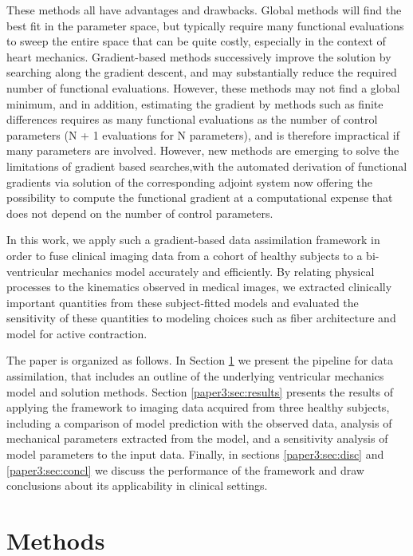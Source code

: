 These methods all have advantages and drawbacks.  Global methods will find the best fit in the parameter space, but typically require many functional evaluations to sweep
the entire space that can be quite costly, especially in the context of heart mechanics. Gradient-based
methods successively improve the solution by
searching along the gradient descent, and may substantially reduce the
required number of functional evaluations. However, these methods may
not find a global minimum, and in addition, estimating the
gradient by methods such as finite differences requires as
  many functional evaluations as the number of control parameters (N + 1
  evaluations for N parameters), and is therefore impractical
 if many parameters are involved.
However, new methods are emerging to solve the limitations of gradient based searches,with the automated derivation of functional gradients
via solution of the corresponding adjoint system \citep{farrell2013automated}
now offering the possibility to compute the functional gradient at a computational
expense that does not depend on the number of control parameters.

In this work, we apply such a gradient-based data assimilation framework
in order to fuse clinical imaging data from a cohort of healthy subjects to
a bi-ventricular mechanics model accurately and efficiently. By relating physical processes to the
kinematics observed in medical images, we extracted clinically
important quantities from these subject-fitted models and evaluated the
sensitivity of these quantities to modeling choices such as fiber
architecture and model for active contraction.  

The paper is organized as follows. In Section
\ref{paper3:sec:methods} we present the pipeline for data assimilation,
that includes an outline of the underlying ventricular
mechanics model and solution methods. Section \ref{paper3:sec:results}
presents the results of applying the framework to imaging data
acquired from three healthy subjects, including a comparison of model
prediction with the observed data, analysis of mechanical parameters
extracted from the model, and a sensitivity analysis of model
parameters to the input data. Finally, in sections \ref{paper3:sec:disc} and
\ref{paper3:sec:concl} we discuss the performance of the framework and draw
conclusions about its applicability in clinical settings.


\section{Methods}
\label{paper3:sec:methods}

